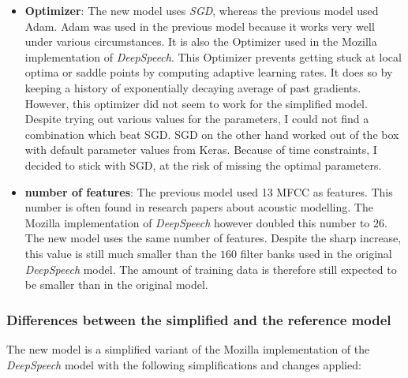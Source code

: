\begin{itemize}
	\item \textbf{Optimizer}: The new model uses \textit{\ac{SGD}}, whereas the previous model used Adam. Adam was used in the previous model because it works very well under various circumstances. It is also the Optimizer used in the Mozilla implementation of \textit{DeepSpeech}. This Optimizer prevents getting stuck at local optima or saddle points by computing adaptive learning rates. It does so by keeping a history of exponentially decaying average of past gradients. However, this optimizer did not seem to work for the simplified model. Despite trying out various values for the parameters, I could not find a combination which beat \ac{SGD}. \ac{SGD} on the other hand worked out of the box with default parameter values from Keras. Because of time constraints, I decided to stick with \ac{SGD}, at the risk of missing the optimal parameters.
	\item \textbf{number of features}: The previous model used 13 \ac{MFCC} as features. This number is often found in research papers about acoustic modelling. The Mozilla implementation of \textit{DeepSpeech} however doubled this number to $26$. The new model uses the same number of features. Despite the sharp increase, this value is still much smaller than the $160$ filter banks used in the original \textit{DeepSpeech} model. The amount of training data is therefore still expected to be smaller than in the original model.
\end{itemize}

\subsubsection{Differences between the simplified and the reference model}
The new model is a simplified variant of the Mozilla implementation of the \textit{DeepSpeech} model with the following simplifications and changes applied:

